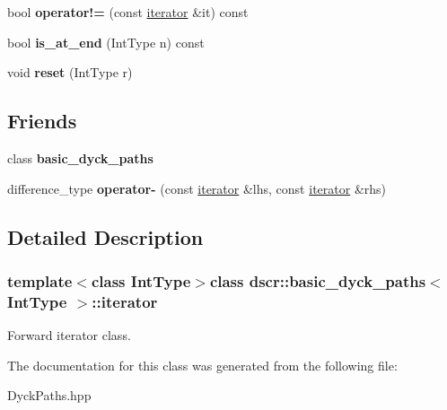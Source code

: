 \begin{DoxyCompactItemize}
\item 
\hypertarget{classdscr_1_1basic__dyck__paths_1_1iterator_a7bc133fd5261e926c4dbfb489f09b3d8}{bool {\bfseries operator!=} (const \hyperlink{classdscr_1_1basic__dyck__paths_1_1iterator}{iterator} \&it) const }\label{classdscr_1_1basic__dyck__paths_1_1iterator_a7bc133fd5261e926c4dbfb489f09b3d8}

\item 
\hypertarget{classdscr_1_1basic__dyck__paths_1_1iterator_a3655a7c8464547eefd4bb0f3fc240bf3}{bool {\bfseries is\-\_\-at\-\_\-end} (Int\-Type n) const }\label{classdscr_1_1basic__dyck__paths_1_1iterator_a3655a7c8464547eefd4bb0f3fc240bf3}

\item 
\hypertarget{classdscr_1_1basic__dyck__paths_1_1iterator_a172fcff2c55aae9dc1073803b7554459}{void {\bfseries reset} (Int\-Type r)}\label{classdscr_1_1basic__dyck__paths_1_1iterator_a172fcff2c55aae9dc1073803b7554459}

\end{DoxyCompactItemize}
\subsection*{Friends}
\begin{DoxyCompactItemize}
\item 
\hypertarget{classdscr_1_1basic__dyck__paths_1_1iterator_a3dd4f1061ed68889e2068166aee9248a}{class {\bfseries basic\-\_\-dyck\-\_\-paths}}\label{classdscr_1_1basic__dyck__paths_1_1iterator_a3dd4f1061ed68889e2068166aee9248a}

\item 
\hypertarget{classdscr_1_1basic__dyck__paths_1_1iterator_a4304f5d7bb1d12de2d2ad2c1e4e64dab}{difference\-\_\-type {\bfseries operator-\/} (const \hyperlink{classdscr_1_1basic__dyck__paths_1_1iterator}{iterator} \&lhs, const \hyperlink{classdscr_1_1basic__dyck__paths_1_1iterator}{iterator} \&rhs)}\label{classdscr_1_1basic__dyck__paths_1_1iterator_a4304f5d7bb1d12de2d2ad2c1e4e64dab}

\end{DoxyCompactItemize}


\subsection{Detailed Description}
\subsubsection*{template$<$class Int\-Type$>$class dscr\-::basic\-\_\-dyck\-\_\-paths$<$ Int\-Type $>$\-::iterator}

Forward iterator class. 

The documentation for this class was generated from the following file\-:\begin{DoxyCompactItemize}
\item 
Dyck\-Paths.\-hpp\end{DoxyCompactItemize}
